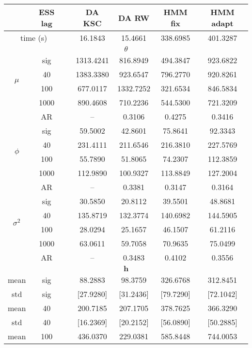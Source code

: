 { \renewcommand{\arraystretch}{1.2} 
\begin{table} 
\center 
\begin{tabular}{ccc cc cc} 
\hline 
 & ESS lag&& DA KSC & DA RW & HMM fix & HMM adapt \\ \hline  \hline
 \multicolumn{2}{c}{time (s)}& & 16.1843  & 15.4661  & 338.6985  & 401.3287  \\  \hline 
\multicolumn{7}{c}{$\theta$} \\ \hline 
\multirow{4}{*}{$\mu$}   & sig &  & 1313.4241  & 816.8949  & 494.3847  & 923.6822  \\ 
 & 40 &  & 1383.3380  & 923.6547  & 796.2770  & 920.8261  \\ 
 & 100 &  & 677.0117  & 1332.7252  & 321.6534  & 846.5834  \\ 
 & 1000 &  & 890.4608  & 710.2236  & 544.5300  & 721.3209  \\ 
 & AR & & --  & 0.3106  & 0.4275  & 0.3416  \\ [1.3ex] 
\multirow{4}{*}{$\phi$}   & sig &  & 59.5002  & 42.8601  & 75.8641  & 92.3343  \\ 
 & 40 &  & 231.4111  & 211.6546  & 216.3810  & 227.5769  \\ 
 & 100 &  & 55.7890  & 51.8065  & 74.2307  & 112.3859  \\ 
 & 1000 &  & 112.9890  & 100.9327  & 113.8849  & 127.2004  \\ 
 & AR & & --  & 0.3381  & 0.3147  & 0.3164  \\ [1.3ex] 
\multirow{4}{*}{$\sigma^2$}   & sig &  & 30.5850  & 20.8112  & 39.5501  & 48.8681  \\ 
 & 40 &  & 135.8719  & 132.3774  & 140.6982  & 144.5905  \\ 
 & 100 &  & 28.0294  & 25.1657  & 46.1507  & 61.2116  \\ 
 & 1000 &  & 63.0611  & 59.7058  & 70.9635  & 75.0499  \\ 
 & AR & & --  & 0.3483  & 0.4102  & 0.3556  \\ [1.3ex] 
\hline 
\multicolumn{7}{c}{$ \bm{h} $} \\ \hline 
mean & sig &  & 88.2883  & 98.3759  & 326.6768  & 312.8451  \\ 
std & sig &  & [27.9280]  & [31.2436]  & [79.7290]  & [72.1042]  \\  [1ex]
mean & 40 &  & 200.7185  & 207.1705  & 378.7625  & 366.3290  \\ 
std & 40 &  & [16.2369]  & [20.2152]  & [56.0890]  & [50.2885]  \\  [1ex]
mean & 100 &  & 436.0370  & 229.0381  & 585.8448  & 744.0053  \\ 

\end{tabular}
\end{table}}
